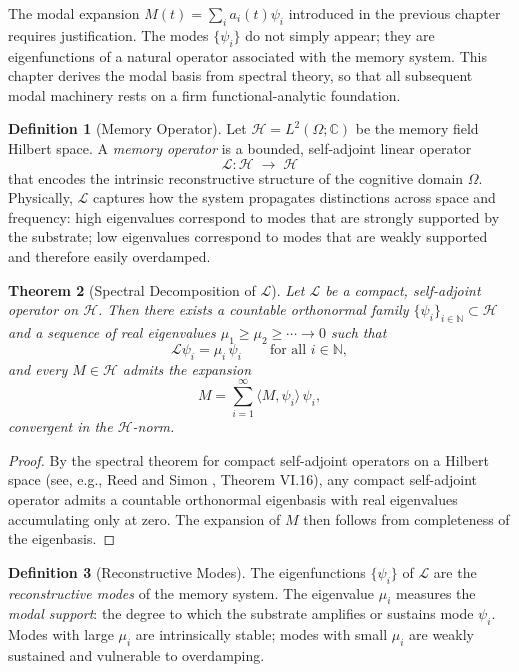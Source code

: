 \documentclass[12pt, oneside]{book}
\theoremstyle{plain}
\newtheorem{theorem}{Theorem}[chapter]
\theoremstyle{definition}
\newtheorem{definition}[theorem]{Definition}
\theoremstyle{remark}
\newcommand{\calH}{\mathcal{H}}
\newcommand{\CC}{\mathbb{C}}
\newcommand{\NN}{\mathbb{N}}
\begin{document}
The modal expansion $M(t) = \sum_i a_i(t)\psi_i$
introduced in the previous chapter requires justification.
The modes $\{\psi_i\}$ do not simply appear; they are
eigenfunctions of a natural operator associated with the
memory system.
This chapter derives the modal basis from spectral theory,
so that all subsequent modal machinery rests on a firm
functional-analytic foundation.

\begin{definition}[Memory Operator]
Let $\calH = L^2(\Omega;\CC)$ be the memory field Hilbert space.
A \emph{memory operator} is a bounded, self-adjoint linear
operator
\[
  \mathcal{L} : \calH \;\longrightarrow\; \calH
\]
that encodes the intrinsic reconstructive structure of the
cognitive domain $\Omega$.
Physically, $\mathcal{L}$ captures how the system propagates
distinctions across space and frequency: high eigenvalues
correspond to modes that are strongly supported by the substrate;
low eigenvalues correspond to modes that are weakly supported
and therefore easily overdamped.
\end{definition}

\begin{theorem}[Spectral Decomposition of $\mathcal{L}$]
\label{thm:spectral}
Let $\mathcal{L}$ be a compact, self-adjoint operator on
$\calH$.
Then there exists a countable orthonormal family
$\{\psi_i\}_{i \in \NN} \subset \calH$ and a sequence of
real eigenvalues $\mu_1 \geq \mu_2 \geq \cdots \to 0$
such that
\[
  \mathcal{L}\psi_i = \mu_i\,\psi_i
  \qquad \text{for all } i \in \NN,
\]
and every $M \in \calH$ admits the expansion
\[
  M = \sum_{i=1}^\infty \langle M, \psi_i\rangle\,\psi_i,
\]
convergent in the $\calH$-norm.
\end{theorem}

\begin{proof}
By the spectral theorem for compact self-adjoint operators
on a Hilbert space (see, e.g., Reed and Simon \cite{ReedSimon1972},
Theorem VI.16), any compact self-adjoint operator admits a
countable orthonormal eigenbasis with real eigenvalues
accumulating only at zero.
The expansion of $M$ then follows from completeness of
the eigenbasis.
\end{proof}

\begin{definition}[Reconstructive Modes]
The eigenfunctions $\{\psi_i\}$ of $\mathcal{L}$ are the
\emph{reconstructive modes} of the memory system.
The eigenvalue $\mu_i$ measures the \emph{modal support}:
the degree to which the substrate amplifies or sustains
mode $\psi_i$.
Modes with large $\mu_i$ are intrinsically stable;
modes with small $\mu_i$ are weakly sustained and
vulnerable to overdamping.
\end{definition}
\end{document}

